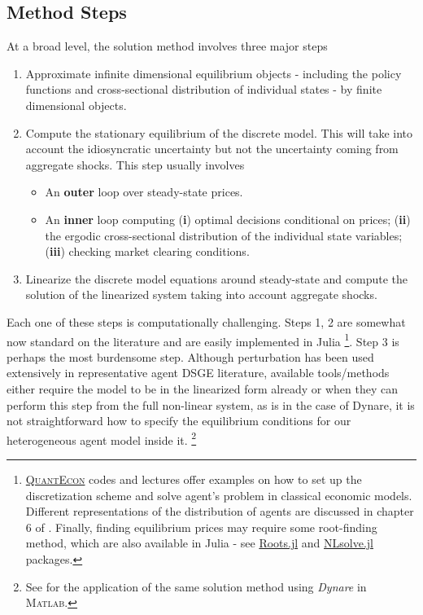\documentclass[paper=a4, fontsize=11pt, twosided]{article}  %
\numberwithin{equation}{section}        %
\numberwithin{figure}{section}          %
\numberwithin{table}{section}               %
\theoremstyle{plain}
\begin{document}
\subsection{Method Steps} %
\label{sub:method_steps}

At a broad level, the solution method involves three major steps
\begin{enumerate}
   \item Approximate infinite dimensional equilibrium objects - including the policy functions and cross-sectional
   distribution of individual states - by finite dimensional objects.

   \item Compute the stationary equilibrium of the discrete model. This will take into account the idiosyncratic
   uncertainty but not the uncertainty coming from aggregate shocks. This step usually involves
   \begin{itemize}
      \item An \textbf{outer} loop over steady-state prices.

      \item An \textbf{inner} loop computing
      (\textbf{i}) optimal decisions conditional on prices;
      (\textbf{ii}) the ergodic cross-sectional distribution of the individual state variables;
      (\textbf{iii}) checking market clearing conditions.
   \end{itemize}

   \item Linearize the discrete model equations around steady-state and compute the solution of the
   linearized system taking into account aggregate shocks.

\end{enumerate}

Each one of these steps is computationally challenging. Steps 1, 2 are somewhat now standard on the literature and
are easily implemented in Julia%
\footnote{%
   \textsc{ \href{http://quant-econ.net/}{QuantEcon}} codes and lectures offer examples on how to set up
   the discretization scheme and solve agent's problem in classical economic models. Different representations
   of the distribution of agents are discussed in chapter 6 of \citet{heermaussner}. Finally, finding equilibrium prices
   may require some root-finding method, which are also available in Julia - see \href{https://github.com/JuliaLang/Roots.jl}{Roots.jl}
   and \href{https://github.com/EconForge/NLsolve.jl}{NLsolve.jl} packages.
}.
Step 3 is perhaps the most burdensome step.
Although perturbation has been used extensively in representative agent DSGE literature,
available tools/methods either require the model to be in the linearized form already or
when they can perform this step from the full non-linear system, as is in the case of Dynare, it is not straightforward how to
specify the equilibrium conditions for our heterogeneous agent model inside it.%
\footnote{%
See \citet{winberry} for the application of the same solution method using \emph{Dynare} in \textsc{Matlab}.
}
\end{document}
